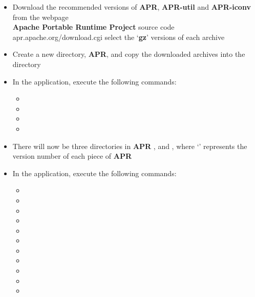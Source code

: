 \begin{itemize}
\item Download the recommended versions of \textbf{APR}, \textbf{APR-util} and
\textbf{APR-iconv} from the web\longDash{}page\\
%
{\textbf{Apache Portable Runtime Project} source code
\openSq{}apr.apache.org/download.cgi\closeSq} \longDash{} select the `\textbf{gz}'
versions of each archive
\item\exSp{}Create a new directory, \textbf{APR}, and copy the downloaded archives into
the directory
\item\exSp{}In the  application, execute the following commands:
\begin{itemize}
\item {}
\item\exSp{}
\item\exSp{}
\item\exSp{}
\end{itemize}
\item\exSp{}There will now be three directories in \textbf{APR} \longDash{}
,  and , where
`' represents the version number of each piece of \textbf{APR}
\item\exSp{}In the  application, execute the following commands:
\begin{itemize}
\item {}
\item\exSp{}
\item\exSp{}
\item\exSp{}
\item\exSp{}
\item\exSp{}
\item\exSp{}
\item\exSp{}
\item\exSp{}
\item\exSp{}
\item\exSp{}

\end{itemize}
\end{itemize}
